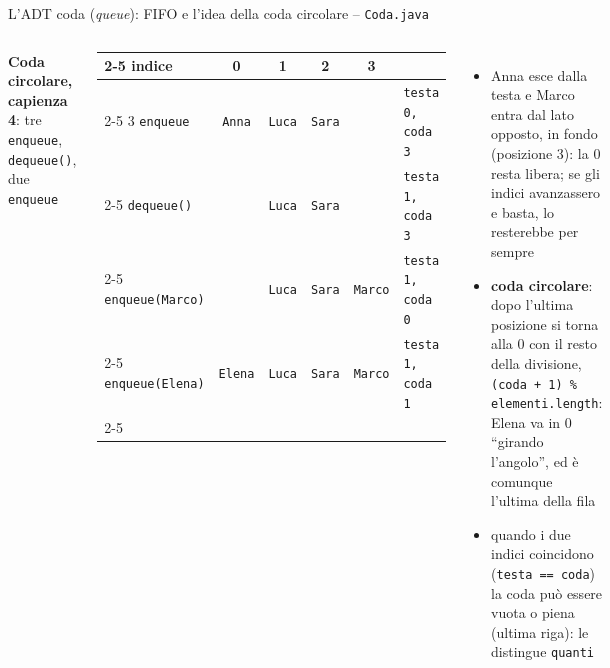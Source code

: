 \documentclass[10pt,aspectratio=169,xcolor={table}]{beamer}
\newcommand{\vuota}{\cellcolor{gray!15}}
\newcommand{\piena}[1]{\cellcolor{blue!12}\texttt{#1}}
\begin{document}
\begin{frame}[fragile]{L'ADT coda (\emph{queue}): FIFO e l'idea della coda circolare -- \texttt{Coda.java}}
\begin{columns}[T]
\footnotesize
\textbf{Coda circolare, capienza 4}: tre \texttt{enqueue}, \texttt{dequeue()}, due \texttt{enqueue}
\begin{center}
\scriptsize\renewcommand{\arraystretch}{1.3}\setlength{\tabcolsep}{3pt}
\begin{tabular}{l|c|c|c|c|l}
\cline{2-5}
indice & 0 & 1 & 2 & 3 & \\
\cline{2-5}
3 \texttt{enqueue} & \piena{Anna} & \piena{Luca} & \piena{Sara} & \vuota & \texttt{testa 0, coda 3} \\
\cline{2-5}
\texttt{dequeue()} & \vuota & \piena{Luca} & \piena{Sara} & \vuota & \texttt{testa 1, coda 3} \\
\cline{2-5}
\texttt{enqueue(Marco)} & \vuota & \piena{Luca} & \piena{Sara} & \piena{Marco} & \texttt{testa 1, coda 0} \\
\cline{2-5}
\texttt{enqueue(Elena)} & \piena{Elena} & \piena{Luca} & \piena{Sara} & \piena{Marco} & \texttt{testa 1, coda 1} \\
\cline{2-5}
\end{tabular}
\end{center}
\begin{itemize}\itemsep=2pt
    \item Anna esce dalla testa e Marco entra dal lato opposto, in fondo (posizione 3): la 0 resta libera; se gli indici avanzassero e basta, lo resterebbe per sempre
    \item \textbf{coda circolare}: dopo l'ultima posizione si torna alla 0 con il resto della divisione, \texttt{(coda + 1) \% elementi.length}: Elena va in 0 ``girando l'angolo'', ed è comunque l'ultima della fila
    \item quando i due indici coincidono (\texttt{testa == coda}) la coda può essere vuota o piena (ultima riga): le distingue \texttt{quanti}
\end{itemize}
\end{columns}
\end{frame}
\end{document}

